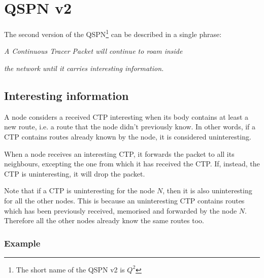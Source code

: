 \documentclass[a4paper]{article}
\begin{document}
\section{QSPN v2}
\label{sec:QSPNv2}
The second version of the QSPN\footnote{The short name of the QSPN v2 is
$Q^2$} can be described in a single phrase:

\emph{A Continuous Tracer Packet will continue to roam inside}

\emph{the network until it carries interesting information.}

\subsection{Interesting information}
\label{sec:interesting_info}

A node considers a received CTP interesting when its body contains at least a
new route, i.e. a route that the node didn't previously know.
In other words, if a CTP contains routes already known by the node, it is
considered uninteresting.

When a node receives an interesting CTP, it forwards the packet to all its
neighbours, excepting the one from which it has received the CTP.
If, instead, the CTP is uninteresting, it will drop the packet.

Note that if a CTP is uninteresting for the node $N$, then it is also
uninteresting for all the other nodes. This is because an uninteresting CTP
contains routes which has been previously received, memorised and forwarded
by the node $N$. Therefore all the other nodes already know the same
routes too.

\subsubsection*{Example}
\label{sec:cycle_qv2_example}
\end{document}
